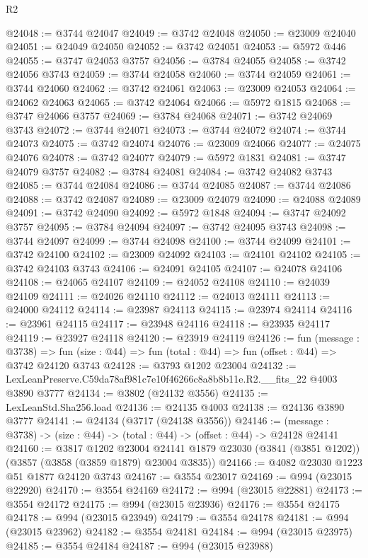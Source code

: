 \begin{lexlean}{R2}
\begin{coremodule}
@24048 := @3744 @24047
@24049 := @3742 @24048
@24050 := @23009 @24040
@24051 := @24049 @24050
@24052 := @3742 @24051
@24053 := @5972 @446
@24055 := @3747 @24053 @3757
@24056 := @3784 @24055
@24058 := @3742 @24056 @3743
@24059 := @3744 @24058
@24060 := @3744 @24059
@24061 := @3744 @24060
@24062 := @3742 @24061
@24063 := @23009 @24053
@24064 := @24062 @24063
@24065 := @3742 @24064
@24066 := @5972 @1815
@24068 := @3747 @24066 @3757
@24069 := @3784 @24068
@24071 := @3742 @24069 @3743
@24072 := @3744 @24071
@24073 := @3744 @24072
@24074 := @3744 @24073
@24075 := @3742 @24074
@24076 := @23009 @24066
@24077 := @24075 @24076
@24078 := @3742 @24077
@24079 := @5972 @1831
@24081 := @3747 @24079 @3757
@24082 := @3784 @24081
@24084 := @3742 @24082 @3743
@24085 := @3744 @24084
@24086 := @3744 @24085
@24087 := @3744 @24086
@24088 := @3742 @24087
@24089 := @23009 @24079
@24090 := @24088 @24089
@24091 := @3742 @24090
@24092 := @5972 @1848
@24094 := @3747 @24092 @3757
@24095 := @3784 @24094
@24097 := @3742 @24095 @3743
@24098 := @3744 @24097
@24099 := @3744 @24098
@24100 := @3744 @24099
@24101 := @3742 @24100
@24102 := @23009 @24092
@24103 := @24101 @24102
@24105 := @3742 @24103 @3743
@24106 := @24091 @24105
@24107 := @24078 @24106
@24108 := @24065 @24107
@24109 := @24052 @24108
@24110 := @24039 @24109
@24111 := @24026 @24110
@24112 := @24013 @24111
@24113 := @24000 @24112
@24114 := @23987 @24113
@24115 := @23974 @24114
@24116 := @23961 @24115
@24117 := @23948 @24116
@24118 := @23935 @24117
@24119 := @23927 @24118
@24120 := @23919 @24119
@24126 := fun (message : @3738) =>
  fun (size : @44) => fun (total : @44) => fun (offset : @44) => @3742 @24120 @3743
@24128 := @3793 @1202 @23004
@24132 := LexLeanPreserve.C59da78af981c7e10f46266c8a8b8b11e.R2.__fits_22 @4003 @3890 @3777
@24134 := @3802 (@24132 @3556)
@24135 := LexLeanStd.Sha256.load
@24136 := @24135 @4003
@24138 := @24136 @3890 @3777
@24141 := @24134 (@3717 (@24138 @3556))
@24146 := (message : @3738) -> (size : @44) -> (total : @44) -> (offset : @44) -> @24128 @24141
@24160 := @3817
    @1202
    @23004
    @24141
    @1879
    @23030
    (@3841 (@3851 @1202))
    (@3857 (@3858 (@3859 @1879) @23004 @3835))
@24166 := @4082 @23030 @1223 @51 @1877 @24120 @3743
@24167 := @3554 @23017
@24169 := @994 (@23015 @22920)
@24170 := @3554 @24169
@24172 := @994 (@23015 @22881)
@24173 := @3554 @24172
@24175 := @994 (@23015 @23936)
@24176 := @3554 @24175
@24178 := @994 (@23015 @23949)
@24179 := @3554 @24178
@24181 := @994 (@23015 @23962)
@24182 := @3554 @24181
@24184 := @994 (@23015 @23975)
@24185 := @3554 @24184
@24187 := @994 (@23015 @23988)

\end{coremodule}
\end{lexlean}
